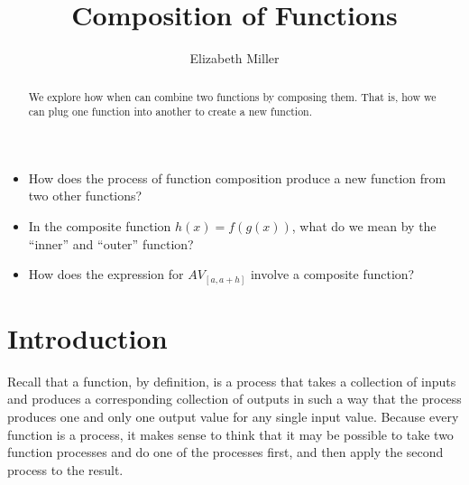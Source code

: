 \documentclass{ximera}
\author{Elizabeth Miller}
\title{Composition of Functions}
\begin{document}
\begin{abstract}
  We explore how when can combine two functions by composing them.  That is, how we can plug one function into another to create a new function.
\end{abstract}
\maketitle



\begin{motivatingQuestions}\begin{itemize}
\item How does the process of function composition produce a new function from two other functions?
\item In the composite function $h(x) = f(g(x))$, what do we mean by the ``inner'' and ``outer'' function?  
\item How does the expression for $AV_{[a,a+h]}$ involve a composite function?
\end{itemize}\end{motivatingQuestions}



\section{Introduction}
Recall that a function, by definition, is a process that takes a collection of inputs and produces a corresponding collection of outputs in such a way that the process produces one and only one output value for any single input value.  Because every function is a process, it makes sense to think that it may be possible to take two function processes and do one of the processes first, and then apply the second process to the result.
\end{document}
